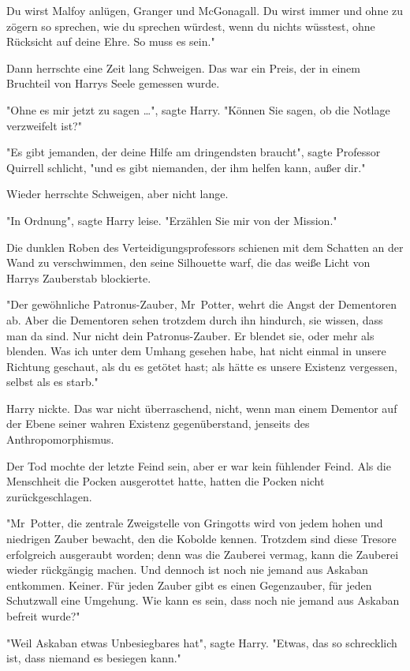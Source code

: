 {Du wirst Malfoy anlügen, Granger und McGonagall. Du wirst immer und ohne zu zögern so sprechen, wie du sprechen würdest, wenn du nichts wüsstest, ohne Rücksicht auf deine Ehre. So muss es sein."

Dann herrschte eine Zeit lang Schweigen. Das war ein Preis, der in einem Bruchteil von Harrys Seele gemessen wurde.

"Ohne es mir jetzt zu sagen …", sagte Harry. "Können Sie sagen, ob die Notlage verzweifelt ist?"

"Es gibt jemanden, der deine Hilfe am dringendsten braucht", sagte Professor Quirrell schlicht, "und es gibt niemanden, der ihm helfen kann, außer dir."

Wieder herrschte Schweigen, aber nicht lange.

"In Ordnung", sagte Harry leise. "Erzählen Sie mir von der Mission."

Die dunklen Roben des Verteidigungsprofessors schienen mit dem Schatten an der Wand zu verschwimmen, den seine Silhouette warf, die das weiße Licht von Harrys Zauberstab blockierte.

"Der gewöhnliche Patronus-Zauber, Mr~Potter, wehrt die Angst der Dementoren ab. Aber die Dementoren sehen trotzdem durch ihn hindurch, sie wissen, dass man da sind. Nur nicht dein Patronus-Zauber. Er blendet sie, oder mehr als blenden. Was ich unter dem Umhang gesehen habe, hat nicht einmal in unsere Richtung geschaut, als du es getötet hast; als hätte es unsere Existenz vergessen, selbst als es starb."

Harry nickte. Das war nicht überraschend, nicht, wenn man einem Dementor auf der Ebene seiner wahren Existenz gegenüberstand, jenseits des Anthropomorphismus.

Der Tod mochte der letzte Feind sein, aber er war kein fühlender Feind. Als die Menschheit die Pocken ausgerottet hatte, hatten die Pocken nicht zurückgeschlagen.

"Mr~Potter, die zentrale Zweigstelle von Gringotts wird von jedem hohen und niedrigen Zauber bewacht, den die Kobolde kennen. Trotzdem sind diese Tresore erfolgreich ausgeraubt worden; denn was die Zauberei vermag, kann die Zauberei wieder rückgängig machen. Und dennoch ist noch nie jemand aus Askaban entkommen. Keiner. Für jeden Zauber gibt es einen Gegenzauber, für jeden Schutzwall eine Umgehung. Wie kann es sein, dass noch nie jemand aus Askaban befreit wurde?"

"Weil Askaban etwas Unbesiegbares hat", sagte Harry. "Etwas, das so schrecklich ist, dass niemand es besiegen kann."

}
